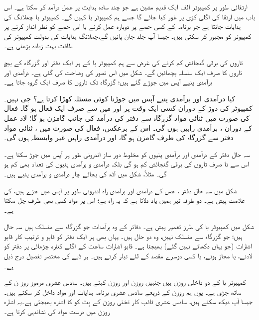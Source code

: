   ارتقائی طور پر کمپیوٹر الف  ایک قدیم  مشین ہے جو  چند سادہ ہدایت پر عمل درآمد کر سکتا ہے۔ اس باب میں  ارتقا کی اگلی کڑی  پر غور کیا جائے گا جسے ہم کمپیوٹر با کہیں گے۔ کمپیوٹر با چھلانگ  کی ہدایات  جانتا ہے جو   برنامہ  کے کسی   حصے پر دوبارہ  عمل کرنے  یا اس حصے کو نظر انداز کرنے پر کمپیوٹر کو  مجبور کر سکتی ہیں۔ جیسا آپ جلد جان پائیں گے،چھلانگ  ہدایات  کی بدولت   کمپیوٹر کی طاقت بہت زیادہ  بڑھتی ہے۔
  
  تاروں کی  برقی گنجائش کم کرنے کی غرض سے ہم کمپیوٹر با   کے ہر ایک دفتر اور  گزرگاہ کے بیچ   تاروں کا صرف ایک سلسلہ بچھائیں گے۔  شکل  میں   اس تصور کی وضاحت کی گئی ہے۔ درآمدی اور برآمدی پنیے آپس میں جوڑے گئے ہیں؛ گزرگاہ  تک  تاروں کا  صرف  ایک گروہ  جاتا ہے۔
  
کیا درآمدی اور برآمدی پنیے آپس میں جوڑنا کوئی  مسئلہ کھڑا کرتا ہے؟ جی نہیں۔ کمپیوٹر کی دوڑ کے دوران کسی ایک وقت پر   اور میں  سے  صرف ایک  فعال ہو گا۔ فعال   کی صورت میں  ثنائی مواد گزرگاہ سے دفتر  کی  درآمد    کی جانب گامزن ہو گا؛ لاد  عمل کے دوران ، برآمدی راہیں ہوں گی۔ اس کے برعکس،  فعال  کی صورت میں ،  ثنائی مواد دفتر سے  گزرگاہ کی طرف گامزن ہو گا، اور درآمدی راہیں غیر وابسطہ ہوں گی۔

سہ  حال دفتر کے درآمدی اور برآمدی پنیوں کو   مخلوط  دور ساز   اندرونی طور  پر  آپس میں جوڑ  سکتا ہے۔ اس سے نا صرف تاروں کی برقی گنجائش کم ہو گی بلکہ  درآمدی و برآمدی   پنیوں کی تعداد بھی کم ہو گی۔ مثلاً، شکل  میں آٹھ کی بجائے چار درآمدی و برآمدی پنیے ہیں۔ 

شکل  میں سہ حال دفتر ، جس کے درآمدی اور برآمدی  راہ  اندرونی طور پر   آپس میں جڑے ہیں، کی علامت  پیش ہے۔ دو طرفہ تیر ہمیں یاد دلاتا ہے کہ یہ راہ ہے؛  اس پر  مواد  کسی بھی  طرف  چل سکتا ہے۔

شکل   میں کمپیوٹر با کی طرز تعمیر پیش ہے۔   دفاتر کے وہ برآمدات جو  گزرگاہ  سے منسلک   ہیں سہ حال ہیں؛ جو  گزرگاہ سے منسلک نہیں، وہ دو حال ہیں۔ یہاں بھی ہر ایک دفتر کو  قابو و ترتیب کار قابو اشارات (جو یہاں دکھائے نہیں گئے)  بھیجتا ہے۔  قابو اشارات ساعت کے   اگلے کنارہ چڑھائی پر دفتر کو لادنے،  یا مجاز  ہونے، یا کسی دوسرے مقصد کے لئے تیار کرتے ہیں۔ ہر ڈبے کی مختصر تفصیل درج ذیل ہے۔

کمپیوٹر با کے دو داخلی روزن ہیں جنہیں روزن  اور روزن  کہتے  ہیں۔  سادس عشری  مرموز   روز ن کے ساتھ جڑی ہے۔ یوں ہم  روزن  کے ذریعے سادس عشری   برنامہ ہدایات اور مواد  داخل کر سکتے ہیں۔ جیسا آپ دیکھ سکتے ہیں، سادس عشری ٹائپ کار تختی روزن   کے بِٹ  کو   کا اشارہ بھیجتی  ہے۔یہ اشارہ روزن  میں درست مواد کی نشاندہی کرتا ہے۔

